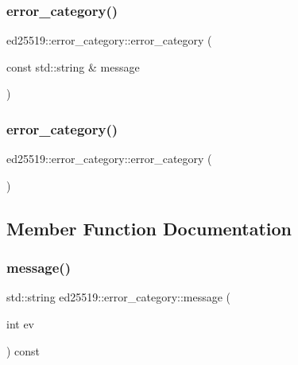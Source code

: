 \subsubsection{\texorpdfstring{error\+\_\+category()}{error\_category()}\hspace{0.1cm}{\footnotesize\ttfamily [1/2]}}
{\footnotesize\ttfamily ed25519\+::error\+\_\+category\+::error\+\_\+category (\begin{DoxyParamCaption}\item[{const std\+::string \&}]{message }\end{DoxyParamCaption})}

\mbox{\label{classed25519_1_1error__category_a4fe3061ad89abff2d326dacbae9cee7d}} 
\subsubsection{\texorpdfstring{error\+\_\+category()}{error\_category()}\hspace{0.1cm}{\footnotesize\ttfamily [2/2]}}
{\footnotesize\ttfamily ed25519\+::error\+\_\+category\+::error\+\_\+category (\begin{DoxyParamCaption}{ }\end{DoxyParamCaption})\hspace{0.3cm}{\ttfamily [inline]}}



\subsection{Member Function Documentation}
\mbox{\label{classed25519_1_1error__category_a202bf6ba84147b563f630c8f52c723ef}} 
\subsubsection{\texorpdfstring{message()}{message()}}
{\footnotesize\ttfamily std\+::string ed25519\+::error\+\_\+category\+::message (\begin{DoxyParamCaption}\item[{int}]{ev }\end{DoxyParamCaption}) const\hspace{0.3cm}{\ttfamily [override]}}

